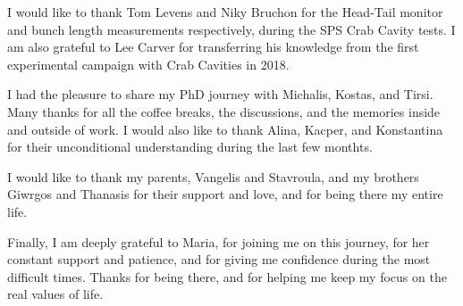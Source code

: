 I would like to thank Tom Levens and Niky Bruchon for the Head-Tail monitor and bunch length measurements respectively, during the SPS Crab Cavity tests. I am also grateful to Lee Carver for transferring his knowledge from the first experimental campaign with Crab Cavities in 2018.

I had the pleasure to share my PhD journey with Michalis, Kostas, and Tirsi. Many thanks for all the coffee breaks, the discussions, and the memories inside and outside of work. I would also like to thank Alina, Kacper, and Konstantina for their unconditional understanding during the last few monthts. 

I would like to thank my parents, Vangelis and Stavroula, and my brothers Giwrgos and Thanasis for their support and love, and for being there my entire life. 


Finally, I am deeply grateful to Maria, for joining me on this journey, for her constant support and patience, and for giving me confidence during the most difficult times. Thanks for being there, and for helping me keep my focus on the real values of life.